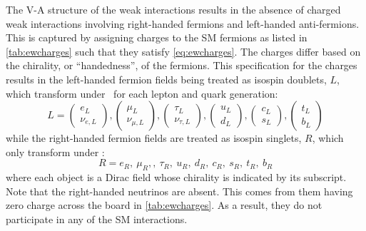 The V-A structure of the weak interactions
results in the absence of charged weak interactions involving right-handed
fermions and left-handed anti-fermions.
This is captured
by assigning charges to the SM fermions 
as listed in \tab\ref{tab:ewcharges}
such that they satisfy \eqn\eqref{eq:ewcharges}.
The charges differ based on the chirality, or ``handedness'',
of the fermions.
This specification for the charges results in the 
left-handed fermion fields being treated as isospin doublets, $L$, 
which transform under \sutwo~for each lepton and quark generation:
\begin{equation}
L = 
\begin{pmatrix} e_L \\ \nu_{e,L} \end{pmatrix},
\begin{pmatrix} \mu_L \\ \nu_{\mu,L} \end{pmatrix},
\begin{pmatrix} \tau_L \\ \nu_{\tau,L} \end{pmatrix},
\begin{pmatrix} u_L \\ d_{L} \end{pmatrix},
\begin{pmatrix} c_L \\ s_{L} \end{pmatrix},
\begin{pmatrix} t_L \\ b_{L} \end{pmatrix}
\end{equation}
while the right-handed fermion fields are treated as isospin singlets, $R$, 
which only transform under \uone:
\begin{equation}
R = e_R,~\mu_R,,~\tau_R,~u_R,~d_R,~c_R,~s_R,~t_R,~b_R
\end{equation}
where each object is a Dirac field whose chirality is indicated by 
its subscript.
Note that the right-handed neutrinos are absent.
This comes from them having zero charge across 
the board in \tab\ref{tab:ewcharges}.
As a result, they do not participate in any of the SM interactions.

